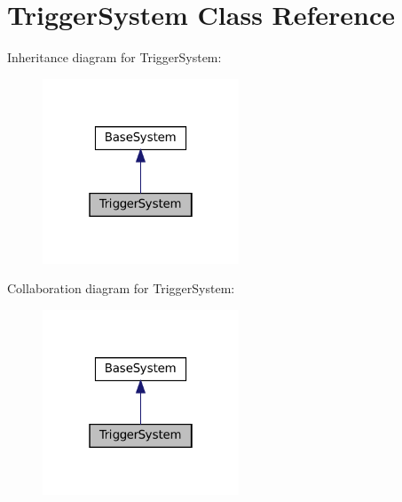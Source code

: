 \hypertarget{classTriggerSystem}{}\section{Trigger\+System Class Reference}
\label{classTriggerSystem}


Inheritance diagram for Trigger\+System\+:
\nopagebreak
\begin{figure}[H]
\begin{center}
\leavevmode
\includegraphics[width=166pt]{classTriggerSystem__inherit__graph}
\end{center}
\end{figure}


Collaboration diagram for Trigger\+System\+:
\nopagebreak
\begin{figure}[H]
\begin{center}
\leavevmode
\includegraphics[width=166pt]{classTriggerSystem__coll__graph}
\end{center}
\end{figure}
